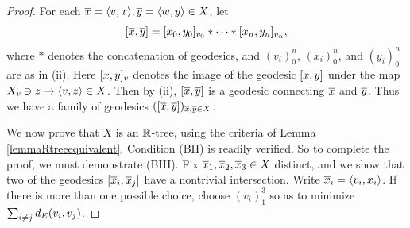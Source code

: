 \begin{proof}

For each $\overline x = \langle v,x\rangle,\overline y = \langle w,y\rangle\in X$, let
\[
[\overline x,\overline y]= [x_0,y_0]_{v_0}\ast \cdots \ast [x_n,y_n]_{v_n},
\]
where $\ast$ denotes the concatenation of geodesics, and $(v_i)_0^n$, $(x_i)_0^n$, and $(y_i)_0^n$ are as in (ii). Here $[x,y]_v$ denotes the image of the geodesic $[x,y]$ under the map $X_v\ni z\to \langle v,z\rangle\in X$. Then by (ii), $[\overline x,\overline y]$ is a geodesic connecting $\overline x$ and $\overline y$. Thus we have a family of geodesics $([\overline x,\overline y])_{\overline x,\overline y\in X}$.

We now prove that $X$ is an $\R$-tree, using the criteria of Lemma \ref{lemmaRtreeequivalent}. Condition (BII) is readily verified. So to complete the proof, we must demonstrate (BIII). Fix $\overline x_1,\overline x_2,\overline x_3\in X$ distinct, and we show that two of the geodesics $[\overline x_i,\overline x_j]$ have a nontrivial intersection. Write $\overline x_i = \langle v_i,x_i\rangle$. If there is more than one possible choice, choose $(v_i)_1^3$ so as to minimize $\sum_{i\neq j} d_E(v_i,v_j)$.


\end{proof}
